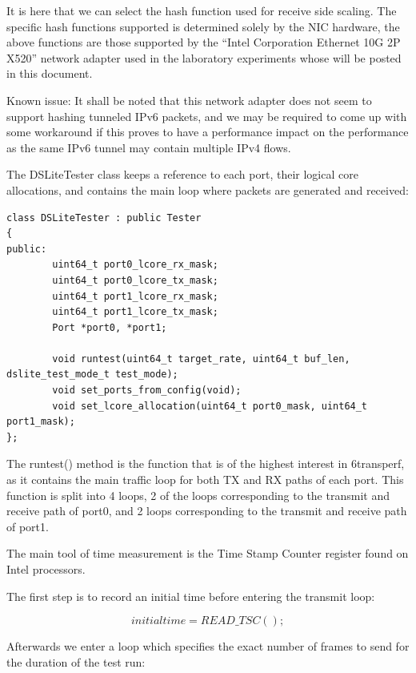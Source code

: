 \documentclass[a4paper,12p,titlepage]{article}
\begin{document}
It is here that we can select the hash function used for receive side scaling. The specific hash functions supported is determined solely by the NIC hardware, the above functions are those supported by the “Intel Corporation Ethernet 10G 2P X520” network adapter used in the laboratory experiments whose will be posted in this document. 

Known issue: It shall be noted that this network adapter does not seem to support hashing tunneled IPv6 packets, and we may be required to come up with some workaround if this proves to have a performance impact on the performance as the same IPv6 tunnel may contain multiple IPv4 flows.
	
The DSLiteTester class keeps a reference to each port, their logical core allocations, and contains the main loop where packets are generated and received:

\begin{frame}

\lstset{language=C++,breaklines=true,numbers=left}
\begin{lstlisting}
class DSLiteTester : public Tester
{
public:
        uint64_t port0_lcore_rx_mask;
        uint64_t port0_lcore_tx_mask;
        uint64_t port1_lcore_rx_mask;
        uint64_t port1_lcore_tx_mask;
        Port *port0, *port1;

        void runtest(uint64_t target_rate, uint64_t buf_len, dslite_test_mode_t test_mode);
        void set_ports_from_config(void);
        void set_lcore_allocation(uint64_t port0_mask, uint64_t port1_mask);
};
\end{lstlisting}
\end{frame}

	The runtest() method is the function that is of the highest interest in 6transperf, as it contains the main traffic loop for both TX and RX paths of each port. This function is split into 4 loops, 2 of the loops corresponding to the transmit and receive path of port0, and 2 loops corresponding to the transmit and receive path of port1. 

The main tool of time measurement is the Time Stamp Counter register found on Intel processors. 

The first step is to record an initial time before entering the transmit loop:

		$$initial time = READ\_TSC();$$

Afterwards we enter a loop which specifies the exact number of frames to send for the duration of the test run:
\end{document}
